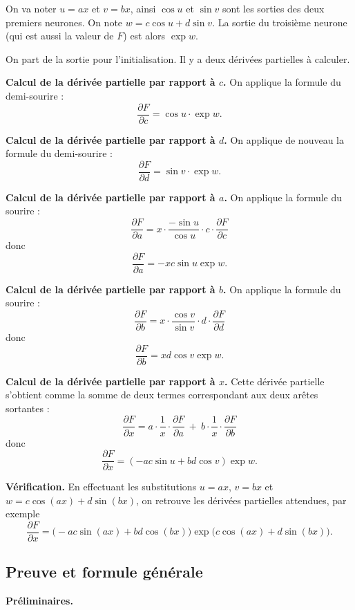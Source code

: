 \documentclass[11pt,class=report,crop=false]{standalone}
\begin{document}
On va noter $u=ax$ et $v=bx$, ainsi $\cos u$ et $\sin v$ sont les sorties des deux premiers neurones. On note $w =c\cos u + d\sin v$. La sortie du troisième neurone (qui est aussi la valeur de $F$) est alors $\exp w$.

On part de la sortie pour l'initialisation. Il y a deux dérivées partielles à calculer.

\textbf{Calcul de la dérivée partielle par rapport à $c$.}
On applique la formule du demi-sourire :
$$\frac{\partial F}{\partial c} = \cos u \cdot \exp w.$$

\textbf{Calcul de la dérivée partielle par rapport à $d$.}
On applique de nouveau la formule du demi-sourire :
$$\frac{\partial F}{\partial d} = \sin v \cdot \exp w.$$

\textbf{Calcul de la dérivée partielle par rapport à $a$.}
On applique la formule du sourire :
$$\frac{\partial F}{\partial a} = x \cdot \frac{-\sin u}{\cos u} \cdot c \cdot  \frac{\partial F}{\partial c}$$
donc 
$$\frac{\partial F}{\partial a} = -x c \sin u \exp w.$$

\textbf{Calcul de la dérivée partielle par rapport à $b$.}
On applique la formule du sourire :
$$\frac{\partial F}{\partial b} = x \cdot \frac{\cos v}{\sin v} \cdot d \cdot  \frac{\partial F}{\partial d}$$
donc 
$$\frac{\partial F}{\partial b} = x d \cos v \exp w.$$

\textbf{Calcul de la dérivée partielle par rapport à $x$.}
Cette dérivée partielle s'obtient comme la somme de deux termes correspondant aux deux arêtes sortantes :
$$\frac{\partial F}{\partial x} = a \cdot \frac{1}{x} \cdot \frac{\partial F}{\partial a} \ + \  b \cdot \frac{1}{x} \cdot \frac{\partial F}{\partial b}$$
donc 
$$\frac{\partial F}{\partial x} = (-ac\sin u + bd\cos v) \exp w.$$

\textbf{Vérification.}
En effectuant les substitutions $u=ax$, $v=bx$ et $w =c\cos (ax) + d\sin (bx)$,
on retrouve les dérivées partielles attendues, par exemple
$$\frac{\partial F}{\partial x} = \big(-ac\sin (ax) + bd\cos (bx) \big) \exp \big(c\cos (ax) + d\sin (bx) \big).$$

\subsection{Preuve et formule générale}


\textbf{Préliminaires.}
\end{document}
